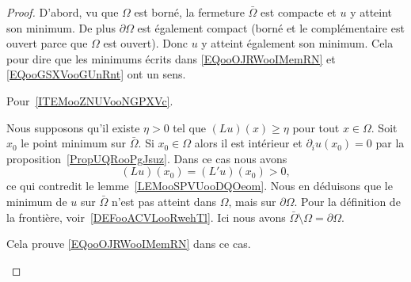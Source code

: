 \begin{proof}
	D'abord, vu que \( \Omega\) est borné, la fermeture \( \bar \Omega\) est compacte et \( u\) y atteint son minimum. De plus \( \partial \Omega\) est également compact (borné et le complémentaire est ouvert parce que \( \Omega\) est ouvert). Donc \( u\) y atteint également son minimum. Cela pour dire que les minimums écrits dans \eqref{EQooOJRWooIMemRN} et \eqref{EQooGSXVooGUnRnt} ont un sens.

	Pour~\ref{ITEMooZNUVooNGPXVc}.

	\begin{subproof}

		Nous supposons qu'il existe \( \eta>0\) tel que \( (Lu)(x)\geq \eta \) pour tout \( x\in \Omega\). Soit \( x_0\) le point minimum sur \(\bar \Omega\). Si \( x_0\in \Omega\) alors il est intérieur et \( \partial_iu(x_0)=0\) par la proposition~\ref{PropUQRooPgJsuz}. Dans ce cas nous avons
		\begin{equation}
			(Lu)(x_0)=(L'u)(x_0)> 0,
		\end{equation}
		ce qui contredit le lemme~\ref{LEMooSPVUooDQOeom}. Nous en déduisons que le minimum de \( u\) sur \( \bar \Omega\) n'est pas atteint dans \( \Omega\), mais sur \( \partial\Omega\). Pour la définition de la frontière, voir~\ref{DEFooACVLooRwehTl}. Ici nous avons \( \bar\Omega\setminus\Omega=\partial\Omega\).

		Cela prouve \eqref{EQooOJRWooIMemRN} dans ce cas.



\end{subproof}
\end{proof}
